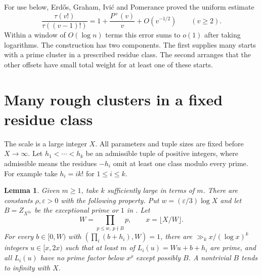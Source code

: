 \documentclass[10pt]{article}
\newtheorem{lemma}[theorem]{Lemma}
\newcommand{\eps}{\varepsilon}
\begin{document}
For use below, Erd\H os, Graham, Ivi\'c and Pomerance \cite[Theorem 2]{EGIP} proved the uniform estimate
\begin{equation}\label{step}
\frac{\tau(v!)}{\tau((v-1)!)}=1+\frac{P^+(v)}v+O(v^{-1/2})\qquad(v\ge2).
\end{equation}
Within a window of $O(\log n)$ terms this error sums to $o(1)$ after taking logarithms. The construction has two components. The first supplies many starts with a prime cluster in a prescribed residue class. The second arranges that the other offsets have small total weight for at least one of these starts.

\section{Many rough clusters in a fixed residue class}
The scale is a large integer $X$. All parameters and tuple sizes are fixed before $X\to\infty$. Let $h_1<\cdots<h_k$ be an admissible tuple of positive integers, where admissible means the residues $-h_i$ omit at least one class modulo every prime. For example take $h_i=i k!$ for $1\le i\le k$.

\begin{lemma}\label{cluster}
Given $m\ge1$, take $k$ sufficiently large in terms of $m$. There are constants $\rho,\eps>0$ with the following property. Put $w=(\eps/3)\log X$ and let $B=Z_{X^{2\eps}}$ be the exceptional prime or $1$ in \cite[(4.8)]{BFM}. Let
\[
 W=\prod_{p\le w,\ p\nmid B}p,\qquad x=\lfloor X/W\rfloor .
\]
For every $b\in[0,W)$ with $(\prod_i(b+h_i),W)=1$, there are $\gg_k x/(\log x)^k$ integers $u\in[x,2x)$ such that at least $m$ of
$L_i(u)=Wu+b+h_i$ are prime, and all $L_i(u)$ have no prime factor below $x^\rho$ except possibly $B$. A nontrivial $B$ tends to infinity with $X$.
\end{lemma}
\end{document}
